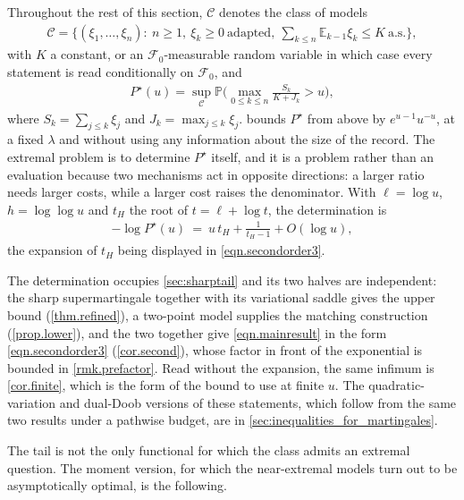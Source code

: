 \documentclass[12pt,oneside,reqno,fleqn]{amsart}
\numberwithin{equation}{section}
\theoremstyle{remark}
\newcommand\cff{{\mathcal F}}
\newcommand\mE{{\mathbb E}}
\newcommand\E{\mE}
\newcommand\PP{{\mathbb P}}
\newcommand{\1}{{\mathbf 1}}
\renewcommand{\le}{\leq}
\renewcommand{\ge}{\geq}
\begin{document}
	Throughout the rest of this section, $\mathcal C$ denotes the class of models
	\begin{align}\label{eqn.class}
	\mathcal C=\Big\{(\xi_1,\dots,\xi_n):\ n\ge1,\ \xi_k\ge0\ \text{adapted},\ \sum_{k\le n}\E_{k-1}\xi_k\le K\ \text{a.s.}\Big\},
	\end{align}
	with $K$ a constant, or an $\cff_0$-measurable random variable in which case every statement is read conditionally on $\cff_0$, and
	\begin{align}\label{eqn.Pstar}
	P^\star(u)=\sup_{\mathcal C}\PP\Big(\max_{0\le k\le n}\frac{S_k}{K+J_k}>u\Big),
	\end{align}
	where $S_k=\sum_{j\le k}\xi_j$ and $J_k=\max_{j\le k}\xi_j$.  bounds $P^\star$ from above by $e^{u-1}u^{-u}$, at a fixed $\lambda$ and without using any information about the size of the record. The extremal problem is to determine $P^\star$ itself, and it is a problem rather than an evaluation because two mechanisms act in opposite directions: a larger ratio needs larger costs, while a larger cost raises the denominator. With $\ell=\log u$, $h=\log\log u$ and $t_H$ the root of $t=\ell+\log t$, the determination is
	\begin{align}\label{eqn.mainresult}
	-\log P^\star(u)\ =\ u\,t_H+\frac1{t_H-1}+O(\log u),
	\end{align}
	the expansion of $t_H$ being displayed in \eqref{eqn.secondorder3}.

	The determination occupies \cref{sec:sharptail} and its two halves are independent: the sharp supermartingale together with its variational saddle gives the upper bound (\cref{thm.refined}), a two-point model supplies the matching construction (\cref{prop.lower}), and the two together give \eqref{eqn.mainresult} in the form \eqref{eqn.secondorder3} (\cref{cor.second}), whose factor in front of the exponential is bounded in \cref{rmk.prefactor}. Read without the expansion, the same infimum is \cref{cor.finite}, which is the form of the bound to use at finite $u$. The quadratic-variation and dual-Doob versions of these statements, which follow from the same two results under a pathwise budget, are in \cref{sec:inequalities_for_martingales}.

	The tail is not the only functional for which the class admits an extremal question. The moment version, for which the near-extremal models turn out to be asymptotically optimal, is the following.
\end{document}
